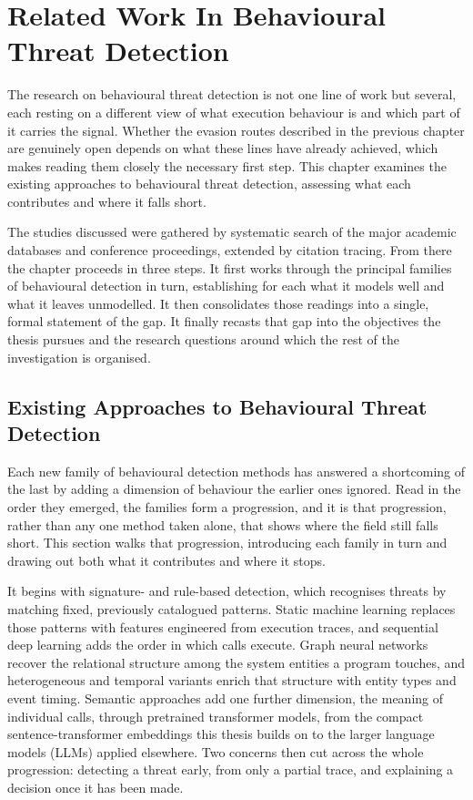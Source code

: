 \documentclass[%
    BCOR=10mm,
    DIV=13,
    toc=bibliography,
    toc=listof,
    oneside,
    12pt,
]{scrbook}
\begin{document}
\chapter{Related Work In Behavioural Threat Detection}
\label{chap:literature}

The research on behavioural threat detection is not one line of work but several,
each resting on a different view of what execution behaviour is and which part of it
carries the signal. Whether the evasion routes described in the previous chapter are
genuinely open depends on what these lines have already achieved, which makes reading
them closely the necessary first step. This chapter examines the existing approaches
to behavioural threat detection, assessing what each contributes and where it falls
short.

The studies discussed were gathered by systematic search of the major academic
databases and conference proceedings, extended by citation tracing. From there the
chapter proceeds in three steps. It first works through the principal families of
behavioural detection in turn, establishing for each what it models well and what it
leaves unmodelled. It then consolidates those readings into a single, formal
statement of the gap. It finally recasts that gap into the objectives the thesis
pursues and the research questions around which the rest of the investigation is
organised.

\section{Existing Approaches to Behavioural Threat Detection}
\label{sec:existing_studies}

Each new family of behavioural detection methods has answered a shortcoming of the
last by adding a dimension of behaviour the earlier ones ignored. Read in the order
they emerged, the families form a progression, and it is that progression, rather
than any one method taken alone, that shows where the field still falls short. This
section walks that progression, introducing each family in turn and drawing out both
what it contributes and where it stops.

It begins with signature- and rule-based detection, which recognises threats by
matching fixed, previously catalogued patterns. Static machine learning replaces
those patterns with features engineered from execution traces, and sequential deep
learning adds the order in which calls execute. Graph neural networks recover the
relational structure among the system entities a program touches, and heterogeneous
and temporal variants enrich that structure with entity types and event timing.
Semantic approaches add one further dimension, the meaning of individual calls,
through pretrained transformer models, from the compact sentence-transformer
embeddings this thesis builds on to the larger language models (LLMs) applied
elsewhere. Two concerns then cut across the whole progression: detecting a threat
early, from only a partial trace, and explaining a decision once it has been made.
\end{document}
